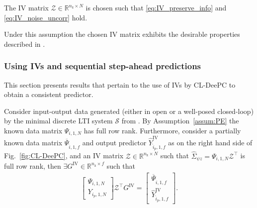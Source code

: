 \begin{assum}\label{assum:IV_def}
    The \acs{IV} matrix $\mathcal{Z}\in\mathbb{R}^{n_\mathrm{z}\times N}$ is chosen such that \eqref{eq:IV_preserve_info} and \eqref{eq:IV_noise_uncorr} hold.
\end{assum}
Under this assumption the chosen \acs{IV} matrix exhibits the desirable properties described in .

\subsubsection{Using \ac{IVs} and sequential step-ahead predictions}\label{sec:Theorem1}
\noindent This section presents results that pertain to the use of \ac{IVs} by \ac{CL-DeePC} to obtain a consistent predictor.%
%
\setcounter{thm}{0}
\begin{lem}\label{lem:main_1}
    Consider input-output data generated (either in open or a well-posed closed-loop) by the minimal discrete \ac{LTI} system $\mathcal{S}$ from . By Assumption~\ref{assum:PE} the known data matrix $\Psi_{i,1,N}$ has full row rank. Furthermore, consider a partially known data matrix $\overline{\Psi}_{\hat{i},1,f}$ and output predictor $\widehat{Y}_{\hat{i}_p,1,f}^\mathrm{IV}$ as on the right hand side of Fig.~\ref{fig:CL-DeePC}, and an \acs{IV} matrix $\mathcal{Z}\in\mathbb{R}^{n_\mathrm{z}\times N}$ such that $\hat{\Sigma}_{\psi z}=\Psi_{i,1,N}\mathcal{Z}^\top$ is full row rank, %
    then $\exists G^\mathrm{IV}\in\mathbb{R}^{n_\mathrm{z}\times f}$ such that
    \begin{align}\label{eq:TheoremIV}
        \begin{bmatrix}
            \Psi_{i,1,N}\\Y_{i_p,1,N}
        \end{bmatrix}\mathcal{Z}^\top G^\mathrm{IV} =
        \begin{bmatrix}
            \overline{\Psi}_{\hat{i},1,f}\\\widehat{Y}_{\hat{i}_p,1,f}^\mathrm{IV}
        \end{bmatrix}.
    \end{align}
\end{lem}
